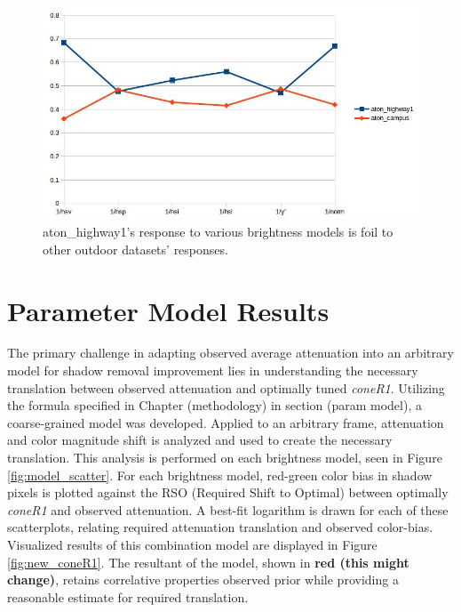 \documentclass[12pt]{report}
\begin{document}
\begin{figure}
\centering
  \includegraphics[width=1\linewidth]{figures/brightness/db/highway1_reciprocal.jpg}
\caption{aton\_highway1's response to various brightness models is foil to other outdoor datasets' responses.}
\label{fig:highway1_reciprocal}
\end{figure}

\section{Parameter Model Results}

The primary challenge in adapting observed average attenuation into an arbitrary model for shadow removal improvement lies in understanding the necessary translation between observed attenuation and optimally tuned \textit{coneR1}. Utilizing the formula specified in Chapter (methodology) in section (param model), a coarse-grained model was developed. Applied to an arbitrary frame, attenuation and color magnitude shift is analyzed and used to create the necessary translation. This analysis is performed on each brightness model, seen in Figure \ref{fig:model_scatter}. For each brightness model, red-green color bias in shadow pixels is plotted against the RSO (Required Shift to Optimal) between optimally \textit{coneR1} and observed attenuation. A best-fit logarithm is drawn for each of these scatterplots, relating required attenuation translation and observed color-bias. Visualized results of this combination model are displayed in Figure \ref{fig:new_coneR1}. The resultant of the model, shown in \textbf{red (this might change)}, retains correlative properties observed prior while providing a reasonable estimate for required translation.
\end{document}

